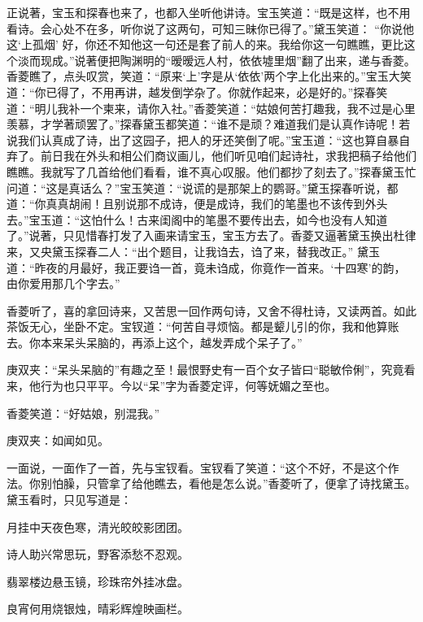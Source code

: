 \begin{parag}
    正说著，宝玉和探春也来了，也都入坐听他讲诗。宝玉笑道：“既是这样，也不用看诗。会心处不在多，听你说了这两句，可知三昧你已得了。”黛玉笑道： “你说他这‘上孤烟’ 好，你还不知他这一句还是套了前人的来。我给你这一句瞧瞧，更比这个淡而现成。”说著便把陶渊明的“暧暧远人村，依依墟里烟”翻了出来，递与香菱。香菱瞧了，点头叹赏，笑道：“原来‘上’字是从‘依依’两个字上化出来的。”宝玉大笑道：“你已得了，不用再讲，越发倒学杂了。你就作起来，必是好的。”探春笑道：“明儿我补一个柬来，请你入社。”香菱笑道：“姑娘何苦打趣我，我不过是心里羡慕，才学著顽罢了。”探春黛玉都笑道：“谁不是顽？难道我们是认真作诗呢！若说我们认真成了诗，出了这园子，把人的牙还笑倒了呢。”宝玉道：“这也算自暴自弃了。前日我在外头和相公们商议画儿，他们听见咱们起诗社，求我把稿子给他们瞧瞧。我就写了几首给他们看看，谁不真心叹服。他们都抄了刻去了。”探春黛玉忙问道：“这是真话么？”宝玉笑道：“说谎的是那架上的鹦哥。”黛玉探春听说，都道：“你真真胡闹！且别说那不成诗，便是成诗，我们的笔墨也不该传到外头去。”宝玉道：“这怕什么！古来闺阁中的笔墨不要传出去，如今也没有人知道了。”说著，只见惜春打发了入画来请宝玉，宝玉方去了。香菱又逼著黛玉换出杜律来，又央黛玉探春二人：“出个题目，让我诌去，诌了来，替我改正。” 黛玉道：“昨夜的月最好，我正要诌一首，竟未诌成，你竟作一首来。‘十四寒’的韵，由你爱用那几个字去。”
\end{parag}


\begin{parag}
    香菱听了，喜的拿回诗来，又苦思一回作两句诗，又舍不得杜诗，又读两首。如此茶饭无心，坐卧不定。宝钗道：“何苦自寻烦恼。都是颦儿引的你，我和他算账去。你本来呆头呆脑的，再添上这个，越发弄成个呆子了。”\begin{note}庚双夹：“呆头呆脑的”有趣之至！最恨野史有一百个女子皆曰“聪敏伶俐”，究竟看来，他行为也只平平。今以“呆”字为香菱定评，何等妩媚之至也。\end{note}香菱笑道：“好姑娘，别混我。”\begin{note}庚双夹：如闻如见。\end{note}一面说，一面作了一首，先与宝钗看。宝钗看了笑道：“这个不好，不是这个作法。你别怕臊，只管拿了给他瞧去，看他是怎么说。”香菱听了，便拿了诗找黛玉。黛玉看时，只见写道是：
\end{parag}


\begin{poem}
    \begin{pl}月挂中天夜色寒，清光皎皎影团团。\end{pl}

    \begin{pl}诗人助兴常思玩，野客添愁不忍观。\end{pl}

    \begin{pl}翡翠楼边悬玉镜，珍珠帘外挂冰盘。\end{pl}

    \begin{pl}良宵何用烧银烛，晴彩辉煌映画栏。\end{pl}
\end{poem}



